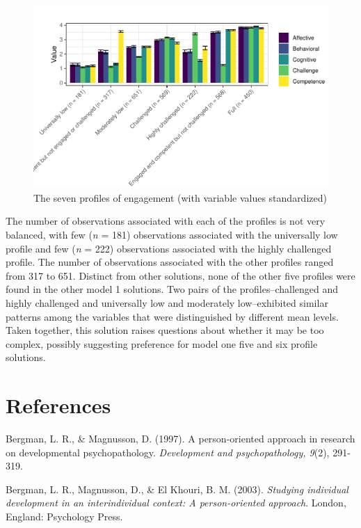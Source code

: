 \documentclass[]{book}
\theoremstyle{definition}
\theoremstyle{definition}
\theoremstyle{definition}
\theoremstyle{remark}
\begin{document}
\begin{figure}

{\centering \includegraphics[width=1\linewidth]{rosenberg-dissertation_files/figure-latex/unnamed-chunk-19-1} 

}

\caption{The seven profiles of engagement (with variable values standardized)}\label{fig:unnamed-chunk-19}
\end{figure}

The number of observations associated with each of the profiles is not
very balanced, with few (\emph{n} = 181) observations associated with
the universally low profile and few (\emph{n} = 222) observations
associated with the highly challenged profile. The number of
observations associated with the other profiles ranged from 317 to 651.
Distinct from other solutions, none of the other five profiles were
found in the other model 1 solutions. Two pairs of the
profiles--challenged and highly challenged and universally low and
moderately low--exhibited similar patterns among the variables that were
distinguished by different mean levels. Taken together, this solution
raises questions about whether it may be too complex, possibly
suggesting preference for model one five and six profile solutions.

\chapter{References}\label{references}

Bergman, L. R., \& Magnusson, D. (1997). A person-oriented approach in
research on developmental psychopathology. \emph{Development and
psychopathology, 9}(2), 291-319.

Bergman, L. R., Magnusson, D., \& El Khouri, B. M. (2003).
\emph{Studying individual development in an interindividual context: A
person-oriented approach}. London, England: Psychology Press.
\end{document}
